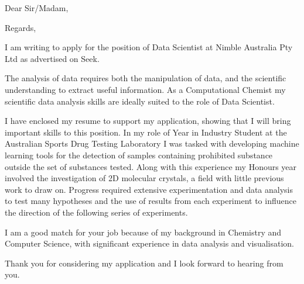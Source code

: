 


\recipient{~}{~}
\date{\today}
\opening{Dear Sir/Madam,}
\closing{Regards,}



\makelettertitle

I am writing to apply for the position of Data Scientist at Nimble Australia Pty Ltd as advertised on Seek.

The analysis of data requires both the manipulation of data, and the scientific understanding to extract useful information. As a Computational Chemist my scientific data analysis skills are ideally suited to the role of Data Scientist.

I have enclosed my resume to support my application, showing that I will bring important skills to this position. In my role of Year in Industry Student at the Australian Sports Drug Testing Laboratory I was tasked with developing machine learning tools for the detection of samples containing prohibited substance outside the set of substances tested. Along with this experience my Honours year involved the investigation of 2D molecular crystals, a field with little previous work to draw on. Progress required extensive experimentation and data analysis to test many hypotheses and the use of results from each experiment to influence the direction of the following series of experiments.

I am a good match for your job because of my background in Chemistry and Computer Science, with significant experience in data analysis and visualisation.

Thank you for considering my application and I look forward to hearing from you.

\makeletterclosing



